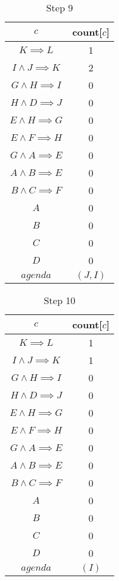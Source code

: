 \documentclass[12pt]{article}
\begin{document}
\begin{itemize}
\begin{table}[H]
\centering
\caption*{Step 9}
\label{my-label1}
\begin{tabular}{ c c }
\hline
$c$ & count[$c$]\\ \hline
$K \implies L$ & 1\\
$I \land J \implies K$ & 2\\
$G \land H \implies I$ & 0\\
$H \land D \implies J$ & 0\\
$E \land H \implies G$ & 0\\
$E \land F \implies H$ & 0\\
$G \land A \implies E$ & 0\\
$A \land B \implies E$ & 0\\
$B \land C \implies F$ & 0\\
$A$ & 0\\
$B$ & 0\\
$C$ & 0\\
$D$ & 0\\ \hline
$agenda$ & $(J, I)$
\end{tabular}
\end{table}
		
\begin{table}[H]
\centering
\caption*{Step 10}
\label{my-label1}
\begin{tabular}{ c c }
\hline
$c$ & count[$c$]\\ \hline
$K \implies L$ & 1\\
$I \land J \implies K$ & 1\\
$G \land H \implies I$ & 0\\
$H \land D \implies J$ & 0\\
$E \land H \implies G$ & 0\\
$E \land F \implies H$ & 0\\
$G \land A \implies E$ & 0\\
$A \land B \implies E$ & 0\\
$B \land C \implies F$ & 0\\
$A$ & 0\\
$B$ & 0\\
$C$ & 0\\
$D$ & 0\\ \hline
$agenda$ & $(I)$
\end{tabular}
\end{table}
		

\end{itemize}
\end{document}
